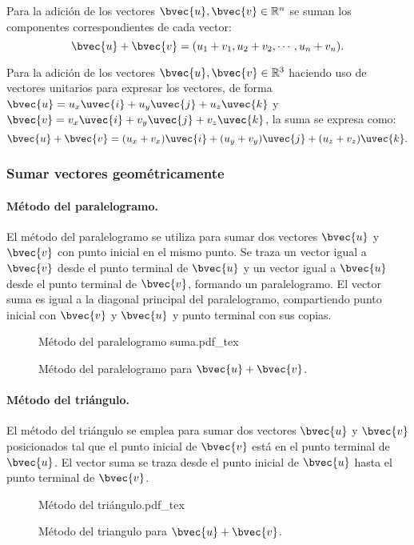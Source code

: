 \documentclass{fmbnotes}
\begin{document}
Para la adición de los vectores \( \bvec{u}, \bvec{v} \in \mathbb{R}^{n} \) se suman los componentes correspondientes de cada vector:
\[ \bvec{u} + \bvec{v} = (u_1 + v_1, u_2 + v_2, \cdots , u_n + v_n).\]

Para la adición de los vectores \( \bvec{u}, \bvec{v} \in \mathbb{R}^{3} \) haciendo uso de vectores unitarios para expresar los vectores, de forma \(\bvec{u} = u_x\uvec{i}+u_y\uvec{j}+u_z\uvec{k}\) y \(\bvec{v} = v_x\uvec{i}+v_y\uvec{j}+v_z\uvec{k}\), la suma se expresa como:
\[ \bvec{u} + \bvec{v} = (u_x + v_x)\uvec{i} + (u_y + v_y)\uvec{j} + (u_z + v_z)\uvec{k}.\]

\subsubsection{Sumar vectores geométricamente}

\paragraph{Método del paralelogramo.} El método del paralelogramo se utiliza para sumar dos vectores \( \bvec{u} \) y \( \bvec{v} \) con punto inicial en el mismo punto. Se traza un vector igual a \(\bvec{v}\) desde el punto terminal de \( \bvec{u} \) y un vector igual a \(\bvec{u}\) desde el punto terminal de \(\bvec{v}\), formando un paralelogramo. El vector suma es igual a la diagonal principal del paralelogramo, compartiendo punto inicial con \(\bvec{v}\) y \( \bvec{u} \) y punto terminal con sus copias.
\begin{figure}[H]
\centering
{Método del paralelogramo suma.pdf_tex}
\caption{Método del paralelogramo para \(\bvec{u}+\bvec{v}\).}
\label{fig:metodo-del-paralelogramo-suma}
\end{figure}

\paragraph{Método del triángulo.} El método del triángulo se emplea para sumar dos vectores \( \bvec{u} \) y \( \bvec{v} \) posicionados tal que el punto inicial de \(\bvec{v}\) está en el punto terminal de \(\bvec{u}\). El vector suma se traza desde el punto inicial de \(\bvec{u}\) hasta el punto terminal de \(\bvec{v}\).
\begin{figure}[H]
\centering
{Método del triángulo.pdf_tex}
\caption{Método del triangulo para \(\bvec{u}+\bvec{v}\).}
\label{fig:metodo-del-triangulo}
\end{figure}
\end{document}
